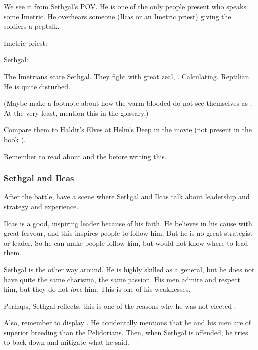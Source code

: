 We see it from Sethgal's POV. 
He is one of the only people present who speaks some Imetric. 
He overhears someone (Ilcas or an Imetric priest) giving the soldiers a peptalk. 

\begin{prose}
  Imetric priest: 
  
  Sethgal: 
\end{prose}

The Imetrians scare Sethgal. 
They fight with great zeal, . 
Calculating. 
Reptilian. 
He is quite disturbed.

(Maybe make a footnote about how the warm-blooded \scathae{} do not see themselves as . At the very least, mention this in the glossary.)

Compare them to Haldir's Elves at Helm's Deep in the movie \cite{Movie:LordoftheRings:II} (not present in the book \cite{JRRTolkien:LordoftheRings:II}). 

Remember to read about  and the \nycans{} before writing this. 





\subsubsection{Sethgal and Ilcas}
After the battle, have a scene where Sethgal and Ilcas talk about leadership and strategy and experience. 

Ilcas is a good, inspiring leader because of his faith. 
He believes in his cause with great fervour, and this inspires people to follow him.
But he is no great strategist or leader. 
So he can make people follow him, but would not know where to lead them. 

Sethgal is the other way around. 
He is highly skilled as a general, but he does not have quite the same charisma, the same passion. 
His men admire and respect him, but they do not \emph{love} him. 
This is one of his weaknesses. 

Perhaps, Sethgal reflects, this is one of the reasons why he was not elected \rayuth{}. 

Also, remember to display . 
He accidentally mentions that he and his men are of superior breeding than the Pelidorians. 
Then, when Sethgal is offended, he tries to back down and mitigate what he said. 

